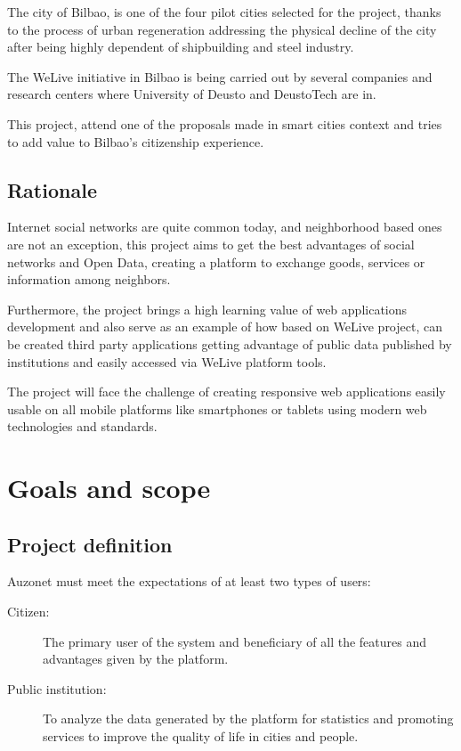 \documentclass{DeustoFDP}
\begin{document}
The city of Bilbao, is one of the four pilot cities selected for the project, thanks to the process of urban regeneration addressing the physical decline of the city after being highly dependent of shipbuilding and steel industry.

The WeLive initiative in Bilbao is being carried out by several companies and research centers where University of Deusto and DeustoTech are in.

This project, attend one of the proposals made in smart cities context and tries to add value to Bilbao's citizenship experience.

\section{Rationale}
Internet social networks are quite common today, and neighborhood based ones are not an exception, this project aims to get the best advantages of social networks and Open Data, creating a platform to exchange goods, services or information among neighbors.

Furthermore, the project brings a high learning value of web applications development and also serve as an example of how based on WeLive project, can be created third party applications getting advantage of public data published by institutions and easily accessed via WeLive platform tools.

The project will face the challenge of creating responsive web applications easily usable on all mobile platforms like smartphones or tablets using modern web technologies and standards. 
\chapter{Goals and scope}\label{cha:goalsandscope}
\section{Project definition}
Auzonet must meet the expectations of at least two types of users:
\begin{description}
	\item[Citizen:] The primary user of the system and beneficiary of all the features and advantages given by the platform.
	\item[Public institution:] To analyze the data generated by the platform for statistics and promoting services to improve the quality of life in cities and people.
\end{description}
\end{document}
